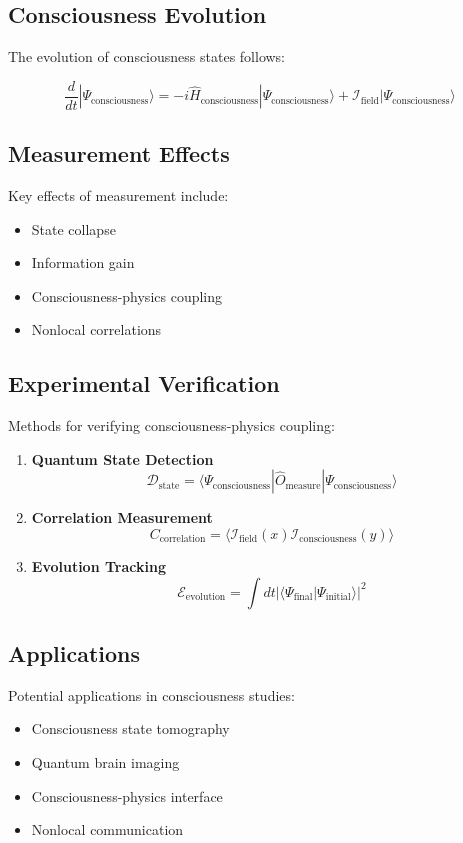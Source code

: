 \subsection{Consciousness Evolution}

The evolution of consciousness states follows:

\[
\frac{d}{dt}|\Psi_{\text{consciousness}}\rangle = -i\hat{H}_{\text{consciousness}}|\Psi_{\text{consciousness}}\rangle + \mathcal{I}_{\text{field}}|\Psi_{\text{consciousness}}\rangle
\]

\subsection{Measurement Effects}

Key effects of measurement include:

\begin{itemize}
    \item State collapse
    \item Information gain
    \item Consciousness-physics coupling
    \item Nonlocal correlations
\end{itemize}

\subsection{Experimental Verification}

Methods for verifying consciousness-physics coupling:

\begin{enumerate}
    \item \textbf{Quantum State Detection}
    \[
    \mathcal{D}_{\text{state}} = \langle \Psi_{\text{consciousness}}|\hat{O}_{\text{measure}}|\Psi_{\text{consciousness}}\rangle
    \]
    
    \item \textbf{Correlation Measurement}
    \[
    C_{\text{correlation}} = \langle \mathcal{I}_{\text{field}}(x)\mathcal{I}_{\text{consciousness}}(y)\rangle
    \]
    
    \item \textbf{Evolution Tracking}
    \[
    \mathcal{E}_{\text{evolution}} = \int dt |\langle \Psi_{\text{final}}|\Psi_{\text{initial}}\rangle|^2
    \]
\end{enumerate}

\subsection{Applications}

Potential applications in consciousness studies:

\begin{itemize}
    \item Consciousness state tomography
    \item Quantum brain imaging
    \item Consciousness-physics interface
    \item Nonlocal communication
\end{itemize} 